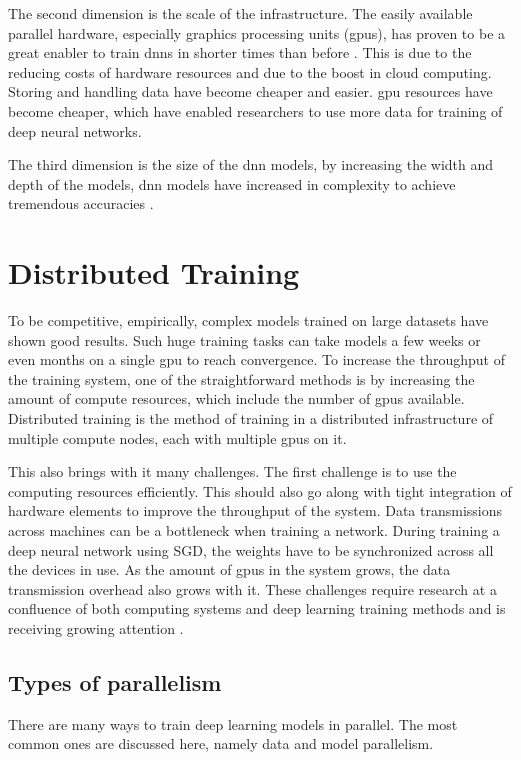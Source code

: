The second dimension is the scale of the infrastructure. The easily available parallel hardware, especially graphics processing units (\acrshort{gpu}s), has proven to be a great enabler to train \acrshort{dnn}s in shorter times than before \cite{Zhang2017Poseidon:Clusters}. This is due to the reducing costs of hardware resources and due to the boost in cloud computing. Storing and handling data have become cheaper and easier. \acrshort{gpu} resources have become cheaper, which have enabled researchers to use more data for training of deep neural networks. 

The third dimension is the size of the \acrshort{dnn} models, by increasing the width and depth of the models, \acrshort{dnn} models have increased in complexity to achieve tremendous accuracies \cite{Dean2012LargeNetworks}. 

\section{Distributed Training}
To be competitive, empirically, complex models trained on large datasets have shown good results. Such huge training tasks can take models a few weeks or even months on a single \acrshort{gpu} to reach convergence. To increase the throughput of the training system, one of the straightforward  methods is by increasing the amount of compute resources, which include the number of \acrshort{gpu}s available. Distributed training is the method of training in a distributed infrastructure of multiple compute nodes, each with multiple \acrshort{gpu}s on it\cite{Langer2020DistributedPerspective}. 

This also brings with it many challenges. The first challenge is to use the computing resources efficiently. This should also go along with tight integration of hardware elements to improve the throughput of the system. Data transmissions across machines can be a bottleneck when training a network. During training a deep neural network using SGD, the weights have to be synchronized across all the devices in use. As the amount of \acrshort{gpu}s in the system grows, the data transmission overhead also grows with it. These challenges require research at a confluence of both computing systems and deep learning training methods and is receiving growing attention \cite{Xiao2018Gandiva:Learning, Mai2020KungFu:Adaptive, Chilimbi2014ProjectSystem, Cui2016GeePS:Server, Peng2018Optimus:Clusters}.

\subsection{Types of parallelism}
There are many ways to train deep learning models in parallel. The most common ones are discussed here, namely data and model parallelism.

